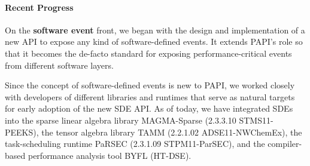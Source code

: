 \paragraph{Recent Progress}

On the \textbf{software event} front, we began with the design and implementation of a new API to 
expose any kind of software-defined events. It extends PAPI's role so that it becomes 
the de-facto standard for exposing performance-critical events from different software
layers.

Since the concept of software-defined events is new to PAPI, we worked closely with 
developers of different libraries and runtimes that serve as natural targets for early 
adoption of the new SDE API.
As of today, we have integrated SDEs into the sparse linear algebra library MAGMA-Sparse 
(2.3.3.10 STMS11-PEEKS), the tensor algebra library TAMM (2.2.1.02 ADSE11-NWChemEx), 
the task-scheduling runtime PaRSEC (2.3.1.09 STPM11-ParSEC), and the compiler-based 
performance analysis tool BYFL (HT-DSE). 

